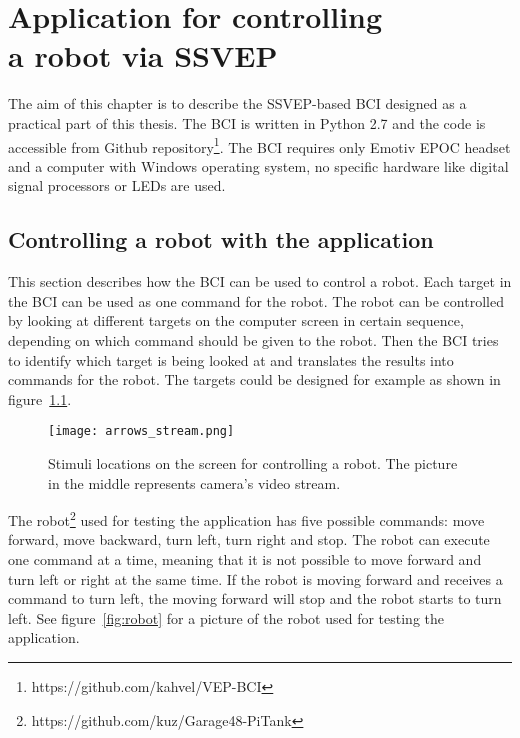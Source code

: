 
\chapter[Application for controlling a robot via SSVEP]{Application for controlling\\ a robot via SSVEP}
\label{sec:SSVEP_BCI}

The aim of this chapter is to describe the \gls{SSVEP}-based \gls{BCI} designed as a practical part of this thesis. The \gls{BCI} is written in Python 2.7 and the code is accessible from Github repository\footnote{https://github.com/kahvel/VEP-BCI}. The \gls{BCI} requires only Emotiv EPOC headset and a computer with Windows operating system, no specific hardware like digital signal processors or \glspl{LED} are used.

\section{Controlling a robot with the application}

This section describes how the \gls{BCI} can be used to control a robot. Each \gls{target} in the \gls{BCI} can be used as one command for the robot. The robot can be controlled by looking at different \glspl{target} on the computer screen in certain sequence, depending on which command should be given to the robot. Then the \gls{BCI} tries to identify which \gls{target} is being looked at and translates the results into commands for the robot. The \glspl{target} could be designed for example as shown in figure~\ref{fig:arrow_stimuli}.

\begin{figure}[h]
	\centering
	\texttt{[image: arrows\_stream.png]}
	\caption{Stimuli locations on the screen for controlling a robot. The picture in the middle represents camera's video stream.}
	\label{fig:arrow_stimuli}
\end{figure}

The robot\footnote{https://github.com/kuz/Garage48-PiTank} used for testing the application has five possible commands: move forward, move backward, turn left, turn right and stop. The robot can execute one command at a time, meaning that it is not possible to move forward and turn left or right at the same time. If the robot is moving forward and receives a command to turn left, the moving forward will stop and the robot starts to turn left. See figure~\ref{fig:robot} for a picture of the robot used for testing the application.

